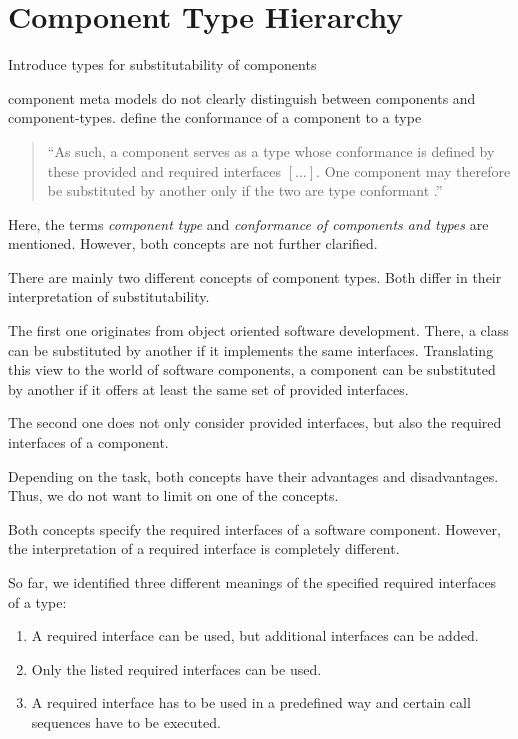 \section{Component Type Hierarchy}
\label{sec:ComponentTypes}

Introduce types for substitutability of components

component meta models do not clearly distinguish between components and
component-types.
define the conformance of a component to a type

\begin{quote}
``As such, a component serves as a type whose conformance is defined by these
provided and required interfaces $[\ldots]$. One component may therefore be
substituted by another only if the two are type conformant
\cite[p.142]{OMGUML2005a}.''
\end{quote}

Here, the terms \emph{component type} and \emph{conformance of components and
types} are mentioned. However, both concepts are not further clarified. 

There are mainly two different concepts of component types. Both differ in
their interpretation of substitutability. 

The first one originates from object
oriented software development. There, a class can be substituted by another if
it implements the same interfaces. Translating this view to the
world of software components, a component can be substituted by another if it
offers at least the same set of provided interfaces.

The second one does not only consider provided interfaces, but also the
required interfaces of a component.

Depending on the task, both concepts have their advantages and disadvantages.
Thus, we do not want to limit on one of the concepts.

Both concepts specify the required interfaces of a software component. However,
the interpretation of a required interface is completely different.

So far, we identified three different meanings of the specified required
interfaces of a type:
\begin{enumerate}
\item	A required interface can be used, but additional interfaces can be
added.
\item	Only the listed required interfaces can be used.
\item	A required interface has to be used in a predefined way and certain call
sequences have to be executed. 
\end{enumerate}

